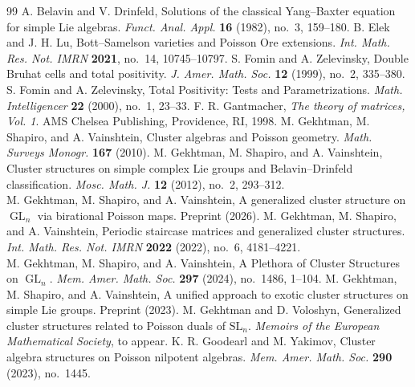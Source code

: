 \documentclass[11pt]{article}
\DeclareMathOperator{\GL}{GL}
\theoremstyle{definition}\newtheorem{definition}[theorem]{Definition}
\theoremstyle{definition}\newtheorem{remark}[theorem]{Remark}
\theoremstyle{remark}
\numberwithin{equation}{section}
\begin{document}
\begin{thebibliography}{99}
     A. Belavin and V. Drinfeld, Solutions of the classical Yang--Baxter equation for simple Lie algebras. \emph{Funct. Anal. Appl.} \textbf{16} (1982), no.~3, 159--180. 
     B. Elek and J. H. Lu, Bott--Samelson varieties and Poisson Ore extensions. \emph{Int. Math. Res. Not. IMRN} \textbf{2021}, no.~14, 10745--10797. 
     S. Fomin and A. Zelevinsky, Double Bruhat cells and total positivity. \emph{J. Amer. Math. Soc.} \textbf{12} (1999), no.~2, 335--380.
     S. Fomin and A. Zelevinsky, Total Positivity: Tests and Parametrizations. \emph{Math. Intelligencer} \textbf{22} (2000), no.~1, 23--33. 
     F. R. Gantmacher, \emph{The theory of matrices, Vol. 1}. AMS Chelsea Publishing, Providence, RI, 1998.
     M. Gekhtman, M. Shapiro, and A. Vainshtein, Cluster algebras and Poisson geometry. \emph{Math. Surveys Monogr.} \textbf{167} (2010). 
     M. Gekhtman, M. Shapiro, and A. Vainshtein, Cluster structures on simple complex Lie groups and Belavin--Drinfeld classification. \emph{Mosc. Math. J.} \textbf{12} (2012), no.~2, 293--312. \\  
     M. Gekhtman, M. Shapiro, and A. Vainshtein, A generalized cluster structure on $\GL_n$ via birational Poisson maps. Preprint (2026). 
     M. Gekhtman, M. Shapiro, and A. Vainshtein, Periodic staircase matrices and generalized cluster structures. \emph{Int. Math. Res. Not. IMRN} \textbf{2022} (2022), no.~6, 4181--4221. \\ 
     M. Gekhtman, M. Shapiro, and A. Vainshtein, A Plethora of Cluster Structures on $\GL_n$. \emph{Mem. Amer. Math. Soc.} \textbf{297} (2024), no.~1486, 1--104.   
     M. Gekhtman, M. Shapiro, and A. Vainshtein, A unified approach to exotic cluster structures on simple Lie groups. Preprint (2023). 
     M. Gekhtman and D. Voloshyn, Generalized cluster structures related to Poisson duals of $\mathrm{SL}_n$. \emph{Memoirs of the European Mathematical Society}, to appear.
     K. R. Goodearl and M. Yakimov, Cluster algebra structures on Poisson nilpotent algebras. \emph{Mem. Amer. Math. Soc.} \textbf{290} (2023), no.~1445. 

\end{thebibliography}
\end{document}
